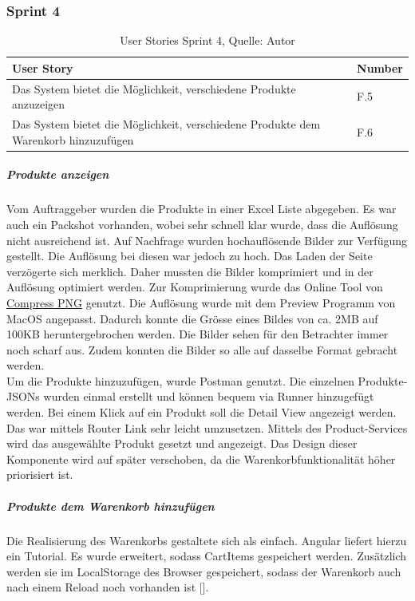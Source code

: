 \subsubsection{Sprint 4}
\begin{table}[H]
	\setlength\extrarowheight{2pt} %
	\begin{tabularx}{\textwidth}{|X|l|}
		\hline
		\textbf{User Story} & \textbf{Number} \\
		\hline
		Das System bietet die Möglichkeit, verschiedene Produkte anzuzeigen& F.5\\
		\hline
		Das System bietet die Möglichkeit, verschiedene Produkte dem Warenkorb hinzuzufügen& F.6\\
		\hline
	\end{tabularx} 
	\caption[User Stories Sprint 4]{User Stories Sprint 4, Quelle: Autor}
\end{table}\label{userStoriesSprint4}

\subparagraph{Produkte anzeigen}
Vom Auftraggeber wurden die Produkte in einer Excel Liste abgegeben. Es war auch ein Packshot vorhanden, wobei sehr schnell klar wurde, dass die Auflösung nicht ausreichend ist. Auf Nachfrage wurden hochauflösende Bilder zur Verfügung gestellt. Die Auflösung bei diesen war jedoch zu hoch. Das Laden der Seite verzögerte sich merklich. Daher mussten die Bilder komprimiert und in der Auflösung optimiert werden. Zur Komprimierung wurde das Online Tool von \href{https://compresspng.com/}{Compress PNG} genutzt. Die Auflösung wurde mit dem Preview Programm von MacOS angepasst. Dadurch konnte die Grösse eines Bildes von ca. 2MB auf 100KB heruntergebrochen werden. Die Bilder sehen für den Betrachter immer noch scharf aus. Zudem konnten die Bilder so alle auf dasselbe Format gebracht werden. \\
Um die Produkte hinzuzufügen, wurde Postman genutzt. Die einzelnen Produkte-JSONs wurden einmal erstellt und können bequem via Runner hinzugefügt werden. 
Bei einem Klick auf ein Produkt soll die Detail View angezeigt werden. Das war mittels Router Link sehr leicht umzusetzen. Mittels des Product-Services wird das ausgewählte Produkt gesetzt und angezeigt. Das Design dieser Komponente wird auf später verschoben, da die Warenkorbfunktionalität höher priorisiert ist. 

\subparagraph{Produkte dem Warenkorb hinzufügen}
Die Realisierung des Warenkorbs gestaltete sich als einfach. Angular liefert hierzu ein Tutorial. Es wurde erweitert, sodass CartItems gespeichert werden. Zusätzlich werden sie im \gls{LocalStorage} des Browser gespeichert, sodass der Warenkorb auch nach einem Reload noch vorhanden ist [\cite{cartAngular}].

